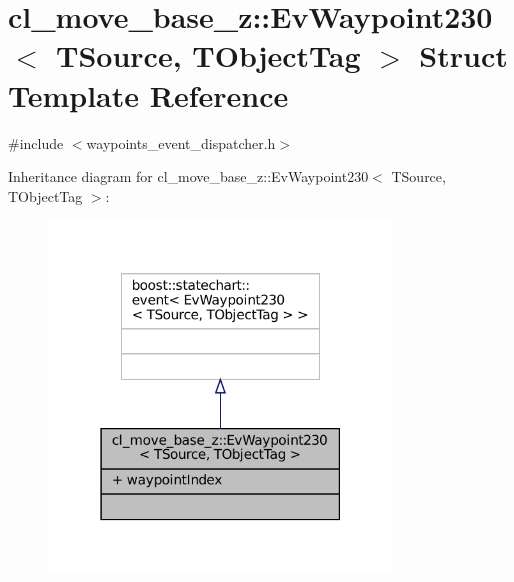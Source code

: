 \hypertarget{structcl__move__base__z_1_1EvWaypoint230}{}\section{cl\+\_\+move\+\_\+base\+\_\+z\+:\+:Ev\+Waypoint230$<$ T\+Source, T\+Object\+Tag $>$ Struct Template Reference}
\label{structcl__move__base__z_1_1EvWaypoint230}


{\ttfamily \#include $<$waypoints\+\_\+event\+\_\+dispatcher.\+h$>$}



Inheritance diagram for cl\+\_\+move\+\_\+base\+\_\+z\+:\+:Ev\+Waypoint230$<$ T\+Source, T\+Object\+Tag $>$\+:
\nopagebreak
\begin{figure}[H]
\begin{center}
\leavevmode
\includegraphics[width=259pt]{structcl__move__base__z_1_1EvWaypoint230__inherit__graph}
\end{center}
\end{figure}


